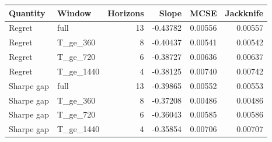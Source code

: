 \begin{tabular}{llrrrr}
\toprule
Quantity & Window & Horizons & Slope & MCSE & Jackknife \\
\midrule
Regret & full & 13 & -0.43782 & 0.00556 & 0.00557 \\
Regret & T\_ge\_360 & 8 & -0.40437 & 0.00541 & 0.00542 \\
Regret & T\_ge\_720 & 6 & -0.38727 & 0.00636 & 0.00637 \\
Regret & T\_ge\_1440 & 4 & -0.38125 & 0.00740 & 0.00742 \\
Sharpe gap & full & 13 & -0.39865 & 0.00552 & 0.00553 \\
Sharpe gap & T\_ge\_360 & 8 & -0.37208 & 0.00486 & 0.00486 \\
Sharpe gap & T\_ge\_720 & 6 & -0.36043 & 0.00585 & 0.00586 \\
Sharpe gap & T\_ge\_1440 & 4 & -0.35854 & 0.00706 & 0.00707 \\
\bottomrule
\end{tabular}
